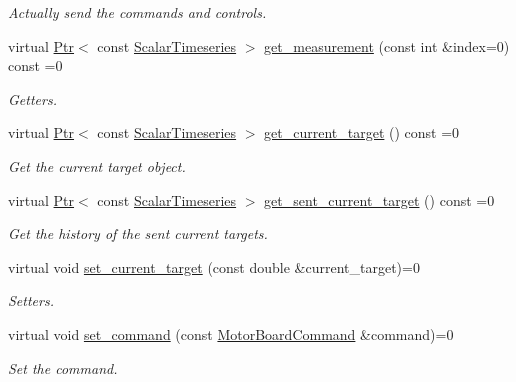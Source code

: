 \begin{DoxyCompactItemize}
\begin{DoxyCompactList}\small\item\em Actually send the commands and controls. \end{DoxyCompactList}\item 
virtual \hyperlink{classblmc__drivers_1_1MotorInterface_ae31f230b9da3674a05543023c90b124c}{Ptr}$<$ const \hyperlink{classblmc__drivers_1_1MotorInterface_a49b8fc916b9f9debbd7b0988463db5cd}{Scalar\+Timeseries} $>$ \hyperlink{classblmc__drivers_1_1MotorInterface_a7f6afed670f078518ccb46e1e3b44892}{get\+\_\+measurement} (const int \&index=0) const =0
\begin{DoxyCompactList}\small\item\em Getters. \end{DoxyCompactList}\item 
virtual \hyperlink{classblmc__drivers_1_1MotorInterface_ae31f230b9da3674a05543023c90b124c}{Ptr}$<$ const \hyperlink{classblmc__drivers_1_1MotorInterface_a49b8fc916b9f9debbd7b0988463db5cd}{Scalar\+Timeseries} $>$ \hyperlink{classblmc__drivers_1_1MotorInterface_a167ffe5df0412b9abcac9a93861e58d2}{get\+\_\+current\+\_\+target} () const =0
\begin{DoxyCompactList}\small\item\em Get the current target object. \end{DoxyCompactList}\item 
virtual \hyperlink{classblmc__drivers_1_1MotorInterface_ae31f230b9da3674a05543023c90b124c}{Ptr}$<$ const \hyperlink{classblmc__drivers_1_1MotorInterface_a49b8fc916b9f9debbd7b0988463db5cd}{Scalar\+Timeseries} $>$ \hyperlink{classblmc__drivers_1_1MotorInterface_a709804e11aa22fbb3107e781c9799bdb}{get\+\_\+sent\+\_\+current\+\_\+target} () const =0
\begin{DoxyCompactList}\small\item\em Get the history of the sent current targets. \end{DoxyCompactList}\item 
virtual void \hyperlink{classblmc__drivers_1_1MotorInterface_a76b49a1228ad549fa407a54c8da14d13}{set\+\_\+current\+\_\+target} (const double \&current\+\_\+target)=0
\begin{DoxyCompactList}\small\item\em Setters. \end{DoxyCompactList}\item 
virtual void \hyperlink{classblmc__drivers_1_1MotorInterface_a723a772b2be5beb0f07097a5b3e00a89}{set\+\_\+command} (const \hyperlink{classblmc__drivers_1_1MotorBoardCommand}{Motor\+Board\+Command} \&command)=0
\begin{DoxyCompactList}\small\item\em Set the command. \end{DoxyCompactList}\end{DoxyCompactItemize}


